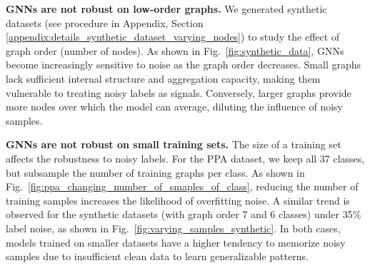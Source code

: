 \textbf{GNNs are not robust on low-order graphs.}
% 
We generated synthetic datasets (see procedure in Appendix, Section \ref{appendix:details_synthetic_dataset_varying_nodes}) to study the effect of graph order (number of nodes). 
% 
As shown in Fig.~\ref{fig:synthetic_data}, GNNs become increasingly sensitive to noise as the graph order decreases. 
% 
Small graphs lack sufficient internal structure and aggregation capacity, making them vulnerable to treating noisy labels as signals.
% 
Conversely, larger graphs provide more nodes over which the model can average, diluting the influence of noisy samples.


\textbf{GNNs are not robust on small training sets.}  
% 
The size of a training set affects the robustness to noisy labels.
% 
For the PPA dataset, we keep all 37 classes, but subsample the number of training graphs per class. 
% 
As shown in Fig.~\ref{fig:ppa_changing_number_of_smaples_of_class}, reducing the number of training samples increases the likelihood of overfitting noise.
% 
A similar trend is observed for the synthetic datasets (with graph order 7 and 6 classes) under 35\% label noise, as shown in Fig.~\ref {fig:varying_samples_synthetic}.
% 
In both cases, models trained on smaller datasets have a higher tendency to memorize noisy samples due to insufficient clean data to learn generalizable patterns.




